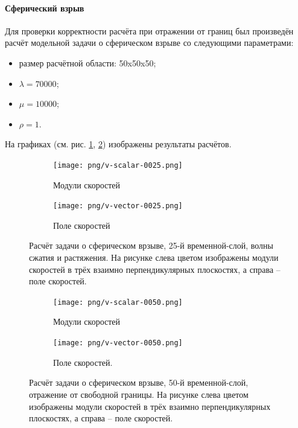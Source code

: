\clearpage
\newpage

\paragraph{Сферический взрыв}
Для проверки корректности расчёта при отражении от границ был произведён расчёт
модельной задачи о сферическом взрыве со следующими параметрами:
\begin{itemize}
\item размер расчётной области: 50x50x50;
\item $\lambda=70000$;
\item $\mu=10000$;
\item $\rho=1$.
\end{itemize}
На графиках (см. рис. \ref{pic:spherical_25}, \ref{pic:spherical_50}) изображены
результаты расчётов.
\begin{figure}[htp]
\begin{subfigure}[b]{0.5\textwidth}
\centering
\texttt{[image: png/v-scalar-0025.png]}
\caption{Модули скоростей}
\end{subfigure}
\begin{subfigure}[b]{0.5\textwidth}
\centering
\texttt{[image: png/v-vector-0025.png]}
\caption{Поле скоростей}
\end{subfigure}
\caption{Расчёт задачи о сферическом врзыве, 25-й временной-слой, волны сжатия и
растяжения. На рисунке слева цветом изображены модули скоростей в трёх взаимно
перпендикулярных плоскостях, а справа -- поле скоростей.}
\label{pic:spherical_25}
\end{figure}
\begin{figure}[htp]
\begin{subfigure}[b]{0.5\textwidth}
\centering
\texttt{[image: png/v-scalar-0050.png]}
\caption{Модули скоростей}
\end{subfigure}
\begin{subfigure}[b]{0.5\textwidth}
\centering
\texttt{[image: png/v-vector-0050.png]}
\caption{Поле скоростей.}
\end{subfigure}
\caption{Расчёт задачи о сферическом врзыве, 50-й временной-слой, отражение от
свободной границы. На рисунке слева цветом изображены модули скоростей в трёх взаимно
перпендикулярных плоскостях, а справа -- поле скоростей.}
\label{pic:spherical_50}
\end{figure}
